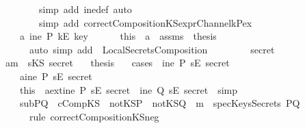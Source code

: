 \begin{isabellebody}
\ \ \ \ \ \ \ \ \ \isamarkupfalse \ {\isacharparenleft}simp\ add{\isacharcolon}\ ine{\isacharunderscore}def{\isacharcomma}\ auto{\isacharparenright}\isanewline
\ \ \ \ \ \ \ \ \ \isamarkupfalse \ {\isacharparenleft}simp\ add{\isacharcolon}\ correctCompositionKS{\isacharunderscore}exprChannel{\isacharunderscore}k{\isacharunderscore}Pex{\isacharparenright}\ \isanewline
\ \ \ \ \ \isamarkupfalse \isanewline
\ \ \ \isamarkupfalse \isanewline
\ \ \ \ \ \isamarkupfalse \ a{}{}{\isacharcolon}{\isachardoublequoteopen}{\isasymnot}\ ine\ P\ {\isacharparenleft}kE\ key{\isacharparenright}{\isachardoublequoteclose}\isanewline
\ \ \ \ \ \isamarkupfalse \ this\ \ a{}\ \ assms\ \isamarkupfalse \ {\isacharquery}thesis\isanewline
\ \ \ \ \ \ \ \isamarkupfalse \ {\isacharparenleft}auto{\isacharcomma}\ simp\ add{\isacharcolon}\ \ LocalSecretsComposition{}{\isacharparenright}\isanewline
\ \ \ \isamarkupfalse \isanewline
\ \isamarkupfalse \isanewline
\ \ \isamarkupfalse \ secret\isanewline
\ \ \isamarkupfalse \ a{}{\isacharcolon}{\isachardoublequoteopen}m\ {\isacharequal}\ sKS\ secret{\isachardoublequoteclose}\isanewline
\ \ \isamarkupfalse \ {\isacharquery}thesis\isanewline
\ \ \isamarkupfalse \ {\isacharparenleft}cases\ \ {\isachardoublequoteopen}ine\ P\ {\isacharparenleft}sE\ secret{\isacharparenright}{\isachardoublequoteclose}{\isacharparenright}\ \isanewline
\ \ \ \ \ \isamarkupfalse \ a{}{}{\isacharcolon}{\isachardoublequoteopen}ine\ P\ {\isacharparenleft}sE\ secret{\isacharparenright}{\isachardoublequoteclose}\ \isanewline
\ \ \ \ \ \isamarkupfalse \ this\ \isamarkupfalse \ a{}{}ext{\isacharcolon}{\isachardoublequoteopen}ine\ P\ {\isacharparenleft}sE\ secret{\isacharparenright}\ {\isacharbar}\ ine\ Q\ {\isacharparenleft}sE\ secret{\isacharparenright}{\isachardoublequoteclose}\ \isamarkupfalse \ simp\isanewline
\ \ \ \ \ \isamarkupfalse \ subPQ\ \ cCompKS\ \ notKSP\ \ notKSQ\ \isamarkupfalse \ {\isachardoublequoteopen}m\ {\isasymnotin}\ specKeysSecrets\ PQ{\isachardoublequoteclose}\ \isanewline
\ \ \ \ \ \ \ \isamarkupfalse \ {\isacharparenleft}rule\ correctCompositionKS{\isacharunderscore}neg{}{\isacharparenright}\ \isanewline

\end{isabellebody}
